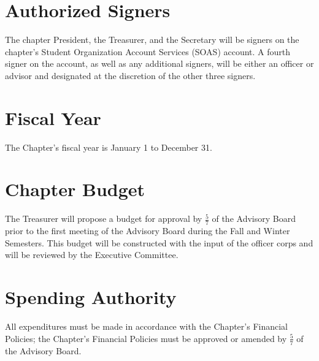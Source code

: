 \section{Authorized Signers}
The chapter President, the Treasurer, and the Secretary will be signers on the chapter's Student Organization Account Services (SOAS) account.
A fourth signer on the account, as well as any additional signers, will be either an officer or advisor and designated at the discretion of the other three signers.
\section{Fiscal Year}
The Chapter's fiscal year is January 1 to December 31.

\section{Chapter Budget}
The Treasurer will propose a budget for approval by $\frac{5}{7}$ of the Advisory Board prior to the first meeting of the Advisory Board during the Fall and Winter Semesters.
This budget will be constructed with the input of the officer corps and will be reviewed by the Executive Committee.
\section{Spending Authority}
All expenditures must be made in accordance with the Chapter’s Financial Policies; the Chapter’s Financial Policies must be approved or amended by $\frac{5}{7}$ of the Advisory Board.
 